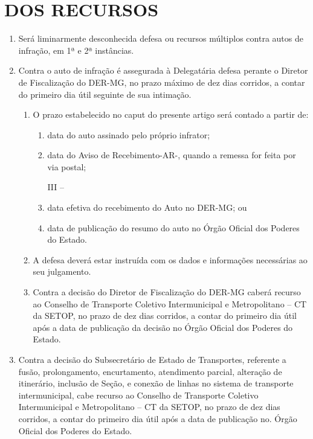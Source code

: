 \chapter{DOS RECURSOS}

\begin{enumerate}[resume, label=Art. \arabic*]

\item Será liminarmente desconhecida defesa ou recursos múltiplos contra autos de infração, em 1ª e 2ª instâncias.

\item Contra o auto de infração é assegurada à Delegatária defesa perante o Diretor de Fiscalização do DER-MG, no prazo máximo de dez dias corridos, a contar do primeiro dia útil seguinte de sua intimação.

\begin{enumerate}[label= \S \arabic*] %

\item O prazo estabelecido no caput do presente artigo será contado a partir de:

\begin{enumerate}[label=\roman*.]

\item data do auto assinado pelo próprio infrator;

\item data do Aviso de Recebimento-AR-, quando a remessa for feita por via postal;

III –\item data efetiva do recebimento do Auto no DER-MG; ou

\item data de publicação do resumo do auto no Órgão Oficial dos Poderes do Estado.

\end{enumerate}

\item A defesa deverá estar instruída com os dados e informações necessárias ao seu julgamento.

\item Contra a decisão do Diretor de Fiscalização do DER-MG caberá recurso ao Conselho de Transporte Coletivo Intermunicipal e Metropolitano – CT da SETOP, no prazo de dez dias corridos, a contar do primeiro dia útil após a data de publicação da decisão no Órgão Oficial dos Poderes do Estado.

\end{enumerate}

\item Contra a decisão do Subsecretário de Estado de Transportes, referente a fusão, prolongamento, encurtamento, atendimento parcial, alteração de itinerário, inclusão de Seção, e conexão de linhas no sistema de transporte intermunicipal, cabe recurso ao Conselho de Transporte Coletivo Intermunicipal e Metropolitano – CT da SETOP, no prazo de dez dias corridos, a contar do primeiro dia útil após a data de publicação no. Órgão Oficial dos Poderes do Estado.


\end{enumerate}
